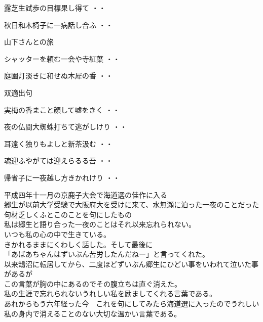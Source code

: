 \begin{shiika}露芝生試歩の目標果し得て
\hfill{・・}\end{shiika}
\begin{shiika}秋日和木椅子に一病話し合ふ
\hfill{・・}\end{shiika}
\vspace{0.6cm}
山下さんとの旅
\begin{shiika}シャッターを頼む一会や寺紅葉
\hfill{・・}\end{shiika}
\begin{shiika}庭園灯淡きに和せぬ木犀の香
\hfill{・・}\end{shiika}
\vspace{0.6cm}
双適出句
\begin{shiika}実梅の香まこと顔して嘘をきく
\hfill{・・}\end{shiika}
\begin{shiika}夜の仏間大蜘蛛打ちて逃がしけり
\hfill{・・}\end{shiika}
\begin{shiika}耳遠く独りもよしと新茶汲む
\hfill{・・}\end{shiika}
\begin{shiika}魂迎ふやがては迎えらるる吾
\hfill{・・}\end{shiika}
\begin{shiika}帰省子に一夜越し方きかれけり
\hfill{・・}\end{shiika}
\qquad\qquad\qquad 平成四年十一月の京鹿子大会で海道選の佳作に入る\\
\qquad\qquad\qquad 郷生が以前大学受験で大阪府大を受けに来て、水無瀬に泊った一夜のことだった\\
\qquad\qquad\qquad 句材乏しくふとこのことを句にしたもの\\
\qquad\qquad\qquad 私は郷生と語り合った一夜のことはそれ以来忘れられない。\\
\qquad\qquad\qquad いつも私の心の中で生きている。\\
\qquad\qquad\qquad きかれるままにくわしく話した。そして最後に\\
\qquad\qquad\qquad「あばあちゃんはずいぶん苦労したんだねー」と言ってくれた。\\
\qquad\qquad\qquad 以来鵠沼に転居してから、二度ほどずいぶん郷生にひどい事をいわれて泣いた事があるが\\
\qquad\qquad\qquad この言葉が胸の中にあるのでその腹立ちは直ぐ消えた。\\
\qquad\qquad\qquad 私の生涯で忘れられないうれしい私を励ましてくれる言葉である。\\
\qquad\qquad\qquad あれからもう六年経った今　これを句にしてみたら海道選に入ったのでうれしい\\
\qquad\qquad\qquad 私の身内で消えることのない大切な温かい言葉である。\\

